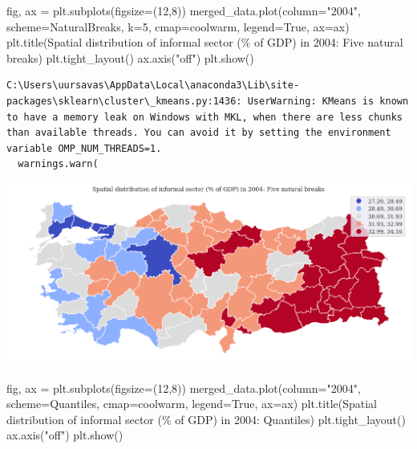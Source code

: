 \documentclass[
  letterpaper,
  DIV=11,
  numbers=noendperiod]{scrreprt}
\newenvironment{Shaded}{\begin{snugshade}}{\end{snugshade}}
\newcommand{\DecValTok}[1]{\textcolor[rgb]{0.68,0.00,0.00}{#1}}
\newcommand{\NormalTok}[1]{\textcolor[rgb]{0.00,0.23,0.31}{#1}}
\newcommand{\OperatorTok}[1]{\textcolor[rgb]{0.37,0.37,0.37}{#1}}
\newcommand{\SpecialCharTok}[1]{\textcolor[rgb]{0.37,0.37,0.37}{#1}}
\newcommand{\StringTok}[1]{\textcolor[rgb]{0.13,0.47,0.30}{#1}}
\newcommand{\VariableTok}[1]{\textcolor[rgb]{0.07,0.07,0.07}{#1}}
\begin{document}
\begin{Shaded}
\begin{Highlighting}[]
\NormalTok{fig, ax }\OperatorTok{=}\NormalTok{ plt.subplots(figsize}\OperatorTok{=}\NormalTok{(}\DecValTok{12}\NormalTok{,}\DecValTok{8}\NormalTok{))}
\NormalTok{merged\_data.plot(column}\OperatorTok{=}\StringTok{"2004"}\NormalTok{, scheme}\OperatorTok{=}\StringTok{\textquotesingle{}NaturalBreaks\textquotesingle{}}\NormalTok{, k}\OperatorTok{=}\DecValTok{5}\NormalTok{, cmap}\OperatorTok{=}\StringTok{\textquotesingle{}coolwarm\textquotesingle{}}\NormalTok{, legend}\OperatorTok{=}\VariableTok{True}\NormalTok{, ax}\OperatorTok{=}\NormalTok{ax)}
\NormalTok{plt.title(}\StringTok{\textquotesingle{}Spatial distribution of informal sector (}\SpecialCharTok{\% o}\StringTok{f GDP) in 2004: Five natural breaks\textquotesingle{}}\NormalTok{)}
\NormalTok{plt.tight\_layout()}
\NormalTok{ax.axis(}\StringTok{"off"}\NormalTok{)}
\NormalTok{plt.show()}
\end{Highlighting}
\end{Shaded}

\begin{verbatim}
C:\Users\uursavas\AppData\Local\anaconda3\Lib\site-packages\sklearn\cluster\_kmeans.py:1436: UserWarning: KMeans is known to have a memory leak on Windows with MKL, when there are less chunks than available threads. You can avoid it by setting the environment variable OMP_NUM_THREADS=1.
  warnings.warn(
\end{verbatim}

\includegraphics{labs/final_informal_files/figure-pdf/cell-4-output-2.png}

\begin{Shaded}
\begin{Highlighting}[]
\NormalTok{fig, ax }\OperatorTok{=}\NormalTok{ plt.subplots(figsize}\OperatorTok{=}\NormalTok{(}\DecValTok{12}\NormalTok{,}\DecValTok{8}\NormalTok{))}
\NormalTok{merged\_data.plot(column}\OperatorTok{=}\StringTok{"2004"}\NormalTok{, scheme}\OperatorTok{=}\StringTok{\textquotesingle{}Quantiles\textquotesingle{}}\NormalTok{,  cmap}\OperatorTok{=}\StringTok{\textquotesingle{}coolwarm\textquotesingle{}}\NormalTok{, legend}\OperatorTok{=}\VariableTok{True}\NormalTok{, ax}\OperatorTok{=}\NormalTok{ax)}
\NormalTok{plt.title(}\StringTok{\textquotesingle{}Spatial distribution of informal sector (}\SpecialCharTok{\% o}\StringTok{f GDP) in 2004: Quantiles\textquotesingle{}}\NormalTok{)}
\NormalTok{plt.tight\_layout()}
\NormalTok{ax.axis(}\StringTok{"off"}\NormalTok{)}
\NormalTok{plt.show()}
\end{Highlighting}
\end{Shaded}
\end{document}
